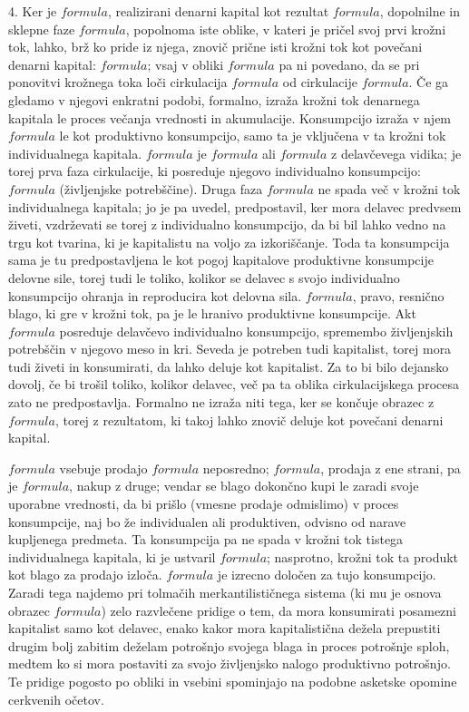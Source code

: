\documentclass[a5paper]{scrbook}
\begin{document}
4. Ker je \( formula \), realizirani denarni kapital kot rezultat \( formula \), dopolnilne in sklepne faze \( formula \), popolnoma iste oblike, v kateri je pričel svoj prvi krožni tok, lahko, brž ko pride iz njega, znovič prične isti krožni tok kot povečani denarni kapital: \( formula \); vsaj v obliki \( formula \) pa ni povedano, da se pri ponovitvi krožnega toka loči cirkulacija \( formula \) od cirkulacije \( formula \). Če ga gledamo v njegovi enkratni podobi, formalno, izraža krožni tok denarnega kapitala le proces večanja vrednosti in akumulacije. Konsumpcijo izraža v njem \( formula \) le kot produktivno konsumpcijo, samo ta je vključena v ta krožni tok individualnega kapitala. \( formula \) je \( formula \) ali \( formula \) z delavčevega vidika; je torej prva faza cirkulacije, ki posreduje njegovo individualno konsumpcijo: \( formula \) (življenjske potrebščine). Druga faza \( formula \) ne spada več v krožni tok individualnega kapitala; jo je pa uvedel, predpostavil, ker mora delavec predvsem živeti, vzdrževati se torej z individualno konsumpcijo, da bi bil lahko vedno na trgu kot tvarina, ki je kapitalistu na voljo za izkoriščanje. Toda ta konsumpcija sama je tu predpostavljena le kot pogoj kapitalove produktivne konsumpcije delovne sile, torej tudi le toliko, kolikor se delavec s svojo individualno konsumpcijo ohranja in reproducira kot delovna sila. \( formula \), pravo, resnično blago, ki gre v krožni tok, pa je le hranivo produktivne konsumpcije. Akt \( formula \) posreduje delavčevo individualno konsumpcijo, spremembo življenjskih potrebščin v njegovo meso in kri. Seveda je potreben tudi kapitalist, torej mora tudi živeti in konsumirati, da lahko deluje kot kapitalist. Za to bi bilo dejansko dovolj, če bi trošil toliko, kolikor delavec, več pa ta oblika cirkulacijskega procesa zato ne predpostavlja. Formalno ne izraža niti tega, ker se končuje obrazec z \( formula \), torej z rezultatom, ki takoj lahko znovič deluje kot povečani denarni kapital.

\( formula \) vsebuje prodajo \( formula \) neposredno; \( formula \), prodaja z ene strani, pa je \( formula \), nakup z druge; vendar se blago dokončno kupi le zaradi svoje uporabne vrednosti, da bi prišlo (vmesne prodaje odmislimo) v proces konsumpcije, naj bo že individualen ali produktiven, odvisno od narave kupljenega predmeta. Ta konsumpcija pa ne spada v krožni tok tistega individualnega kapitala, ki je ustvaril \( formula \); nasprotno, krožni tok ta produkt kot blago za prodajo izloča. \( formula \) je izrecno določen za tujo konsumpcijo. Zaradi tega najdemo pri tolmačih merkantilističnega sistema (ki mu je osnova obrazec \( formula \)) zelo razvlečene pridige o tem, da mora konsumirati posamezni kapitalist samo kot delavec, enako kakor mora kapitalistična dežela prepustiti drugim bolj zabitim deželam potrošnjo svojega blaga in proces potrošnje sploh, medtem ko si mora postaviti za svojo življenjsko nalogo produktivno potrošnjo. Te pridige pogosto po obliki in vsebini spominjajo na podobne asketske opomine cerkvenih očetov.
\end{document}
